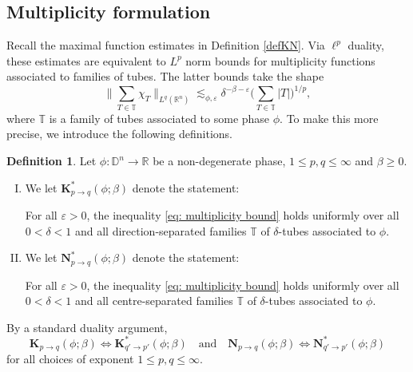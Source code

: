 \documentclass[reqno]{amsart}
\numberwithin{equation}{section}
\newcommand{\D}{\mathbb{D}}
\newcommand{\R}{\mathbb{R}}
\newcommand{\T}{\mathbb{T}}
\newcommand{\bK}{\mathbf{K}}
\newcommand{\bN}{\mathbf{N}}
\theoremstyle{plain}
\theoremstyle{definition}
\newtheorem{definition}[theorem]{Definition}
\begin{document}

\subsection{Multiplicity formulation} Recall the maximal function estimates in Definition \ref{defKN}. Via $\ell^p$ duality, these estimates are equivalent to $L^p$ norm bounds for multiplicity functions associated to families of tubes. The latter bounds take the shape
\begin{equation}\label{eq: multiplicity bound}
      \big\|\sum_{T \in \T} \chi_T\big\|_{L^q(\R^n)} \lesssim_{\phi, \varepsilon} \delta^{-\beta - \varepsilon} \big(\sum_{T \in \T} |T| \big)^{1/p},
    \end{equation}
where $\T$ is a family of tubes associated to some phase $\phi$. To make this more precise, we introduce the following definitions.


\begin{definition} Let $\phi \colon \D^n \to \R$ be a non-degenerate phase, $1 \leq p, q \leq \infty$ and $\beta \geq 0$. 
\begin{enumerate}[I)]
    \item We let $\bK_{p \to q}^*(\phi; \beta)$ denote the statement:\medskip
    
    \noindent For all $\varepsilon > 0$, the inequality
    \eqref{eq: multiplicity bound} holds uniformly over all $0 < \delta < 1$ and all direction-separated families $\T$ of $\delta$-tubes associated to $\phi$.  \medskip
    
    \item We let $\bN_{p \to q}^*(\phi;\beta)$ denote the statement:\medskip
    
    \noindent For all $\varepsilon > 0$, the inequality
    \eqref{eq: multiplicity bound} holds uniformly over all $0 < \delta < 1$ and all centre-separated families $\T$ of $\delta$-tubes associated to $\phi$.
\end{enumerate} 
\end{definition}

By a standard duality argument, 
\begin{equation}\label{eq: Kak/Nik duality}
    \bK_{p \to q}(\phi; \beta) \Leftrightarrow  \bK_{q' \to p'}^*(\phi; \beta) \quad \textrm{and} \quad \bN_{p \to q}(\phi; \beta) \Leftrightarrow  \bN_{q' \to p'}^*(\phi; \beta)
\end{equation}
for all choices of exponent $1 \leq p, q \leq \infty$.
\end{document}

